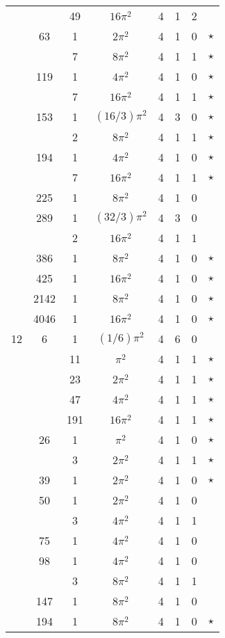 \begin{tabular}{ccc|ccccc}
 &  & 49 & $16\pi^2$ & 4 & 1 & 2 &  \\
 & 63 & 1 & $2\pi^2$ & 4 & 1 & 0 & $\star$ \\
 &  & 7 & $8\pi^2$ & 4 & 1 & 1 & $\star$ \\
 & 119 & 1 & $4\pi^2$ & 4 & 1 & 0 & $\star$ \\
 &  & 7 & $16\pi^2$ & 4 & 1 & 1 & $\star$ \\
 & 153 & 1 & $(16/3)\pi^2$ & 4 & 3 & 0 & $\star$ \\
 &  & 2 & $8\pi^2$ & 4 & 1 & 1 & $\star$ \\
 & 194 & 1 & $4\pi^2$ & 4 & 1 & 0 & $\star$ \\
 &  & 7 & $16\pi^2$ & 4 & 1 & 1 & $\star$ \\
 & 225 & 1 & $8\pi^2$ & 4 & 1 & 0 &  \\
 & 289 & 1 & $(32/3)\pi^2$ & 4 & 3 & 0 &  \\
 &  & 2 & $16\pi^2$ & 4 & 1 & 1 &  \\
 & 386 & 1 & $8\pi^2$ & 4 & 1 & 0 & $\star$ \\
 & 425 & 1 & $16\pi^2$ & 4 & 1 & 0 & $\star$ \\
 & 2142 & 1 & $8\pi^2$ & 4 & 1 & 0 & $\star$ \\
 & 4046 & 1 & $16\pi^2$ & 4 & 1 & 0 & $\star$ \\
12 & 6 & 1 & $(1/6)\pi^2$ & 4 & 6 & 0 &  \\
 &  & 11 & $\pi^2$ & 4 & 1 & 1 & $\star$ \\
 &  & 23 & $2\pi^2$ & 4 & 1 & 1 & $\star$ \\
 &  & 47 & $4\pi^2$ & 4 & 1 & 1 & $\star$ \\
 &  & 191 & $16\pi^2$ & 4 & 1 & 1 & $\star$ \\
 & 26 & 1 & $\pi^2$ & 4 & 1 & 0 & $\star$ \\
 &  & 3 & $2\pi^2$ & 4 & 1 & 1 & $\star$ \\
 & 39 & 1 & $2\pi^2$ & 4 & 1 & 0 & $\star$ \\
 & 50 & 1 & $2\pi^2$ & 4 & 1 & 0 &  \\
 &  & 3 & $4\pi^2$ & 4 & 1 & 1 &  \\
 & 75 & 1 & $4\pi^2$ & 4 & 1 & 0 &  \\
 & 98 & 1 & $4\pi^2$ & 4 & 1 & 0 &  \\
 &  & 3 & $8\pi^2$ & 4 & 1 & 1 &  \\
 & 147 & 1 & $8\pi^2$ & 4 & 1 & 0 &  \\
 & 194 & 1 & $8\pi^2$ & 4 & 1 & 0 & $\star$ \\

\end{tabular}
